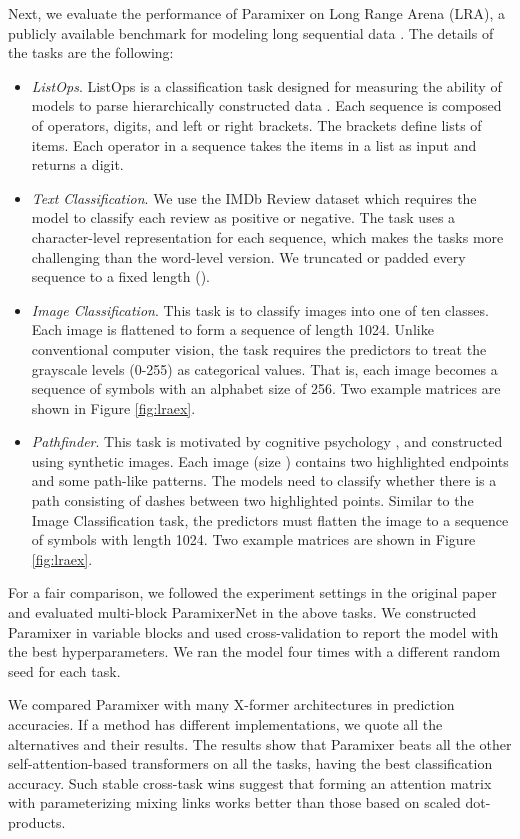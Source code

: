 \documentclass{article}
\begin{document}
Next, we evaluate the performance of Paramixer on Long Range Arena (LRA), a publicly available benchmark for modeling long sequential data \cite{tay2020long}. The details of the tasks are the following:
\begin{itemize}
    \item \emph{ListOps}. ListOps is a classification task designed for measuring the ability of models to parse hierarchically constructed data \cite{nangia2018listops}. Each sequence is composed of operators, digits, and left or right brackets. The brackets define lists of items. Each operator in a sequence takes the items in a list as input and returns a digit.
    \item \emph{Text Classification}. We use the IMDb Review dataset \cite{maas2011learning} which requires the model to classify each review as positive or negative. The task uses a character-level representation for each sequence, which makes the tasks more challenging than the word-level version. We truncated or padded every sequence to a fixed length ().
    \item \emph{Image Classification}. This task is to classify images into one of ten classes. Each image is flattened to form a sequence of length 1024. Unlike conventional computer vision, the task requires the predictors to treat the grayscale levels (0-255) as categorical values. That is, each image becomes a sequence of symbols with an alphabet size of 256. Two example matrices are shown in Figure \ref{fig:lraex}.
    \item \emph{Pathfinder}. This task is motivated by cognitive psychology \cite{linsley2018learning}, and constructed using synthetic images. Each image (size ) contains two highlighted endpoints and some path-like patterns. The models need to classify whether there is a path consisting of dashes between two highlighted points. Similar to the Image Classification task, the predictors must flatten the image to a sequence of symbols with length 1024. Two example matrices are shown in Figure \ref{fig:lraex}.
\end{itemize}


For a fair comparison, we followed the experiment settings in the original paper \cite{tay2020long} and evaluated multi-block ParamixerNet in the above tasks. We constructed Paramixer in variable blocks and used cross-validation to report the model with the best hyperparameters. We ran the model four times with a different random seed for each task. 

We compared Paramixer with many X-former architectures in prediction accuracies. If a method has different implementations, we quote all the alternatives and their results. The results show that Paramixer beats all the other self-attention-based transformers on all the tasks, having the best classification accuracy. Such stable cross-task wins suggest that forming an attention matrix with parameterizing mixing links works better than those based on scaled dot-products. 
\end{document}
